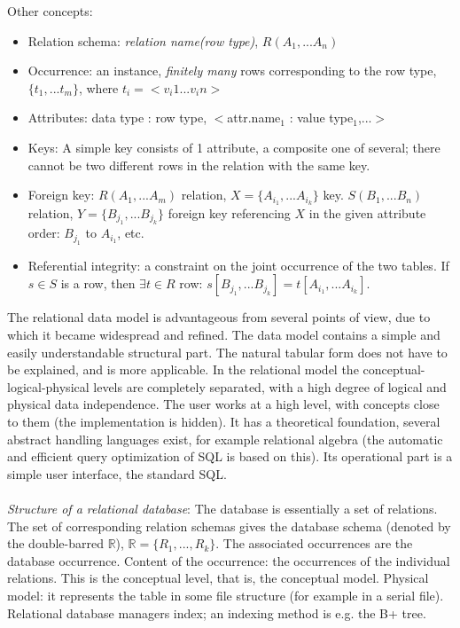 \documentclass[margin=0px]{article}
\begin{document}
Other concepts:
\begin{itemize}
    \item Relation schema: \textit{relation name(row type)}, $R(A_1,...A_n)$
    \item Occurrence: an instance, \textit{finitely many} rows corresponding to the row type, $\{t_1,...t_m\}$, where $t_i = <v_i1...v_in>$
    \item Attributes: data type : row type, $<$attr.name$_1$ : value type$_1$,...$>$
    \item Keys: A simple key consists of 1 attribute, a composite one of several; there cannot be two different rows in the relation with the same key.
    \item Foreign key: $R(A_1,...A_m)$ relation, $X=\{A_{i_1},...A_{i_k}\}$ key. $S(B_1,...B_n)$ relation, $Y=\{B_{j_1},...B_{j_k}\}$ foreign key referencing $X$ in the given attribute order: $B_{j_1}$ to $A_{i_1}$, etc.
    \item Referential integrity: a constraint on the joint occurrence of the two tables. If $s \in S$ is a row, then $\exists t \in R$ row: $s[B_{j_1},...B_{j_k}] = t[A_{i_1},...A_{i_k}]$.
\end{itemize}
The relational data model is advantageous from several points of view, due to which it became widespread and refined. The data model contains a simple and easily understandable structural part. The natural tabular form does not have to be explained, and is more applicable. In the relational model the conceptual-logical-physical levels are completely separated, with a high degree of logical and physical data independence. The user works at a high level, with concepts close to them (the implementation is hidden). It has a theoretical foundation, several abstract handling languages exist, for example relational algebra (the automatic and efficient query optimization of SQL is based on this). Its operational part is a simple user interface, the standard SQL. \\ \\

\textit{Structure of a relational database}: The database is essentially a set of relations. The set of corresponding relation schemas gives the database schema (denoted by the double-barred $\mathbb{R}$), $\mathbb{R} = \{R_1 , ... , R_k\}$. The associated occurrences are the database occurrence. Content of the occurrence: the occurrences of the individual relations. This is the conceptual level, that is, the conceptual model. Physical model: it represents the table in some file structure (for example in a serial file). Relational database managers index; an indexing method is e.g. the B+ tree.
\end{document}
